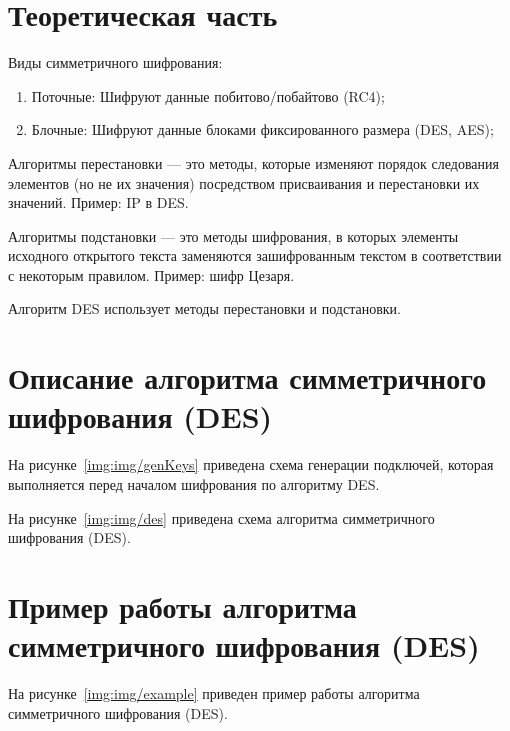 \chapter{Теоретическая часть}

Виды симметричного шифрования:
\begin{enumerate}[label={\arabic*)}]
	\item Поточные: Шифруют данные побитово/побайтово (RC4);
	\item Блочные: Шифруют данные блоками фиксированного размера (DES, AES);	
\end{enumerate}

Алгоритмы перестановки — это методы, которые изменяют порядок следования элементов (но не их значения) посредством присваивания и перестановки их значений. Пример: IP в DES.

Алгоритмы подстановки — это методы шифрования, в которых элементы исходного открытого текста заменяются зашифрованным текстом в соответствии с некоторым правилом. Пример: шифр Цезаря.

Алгоритм DES использует методы перестановки и подстановки.

\chapter{Описание алгоритма симметричного шифрования (DES)}

На рисунке~\ref{img:img/genKeys} приведена схема генерации подключей, которая выполняется перед началом шифрования по алгоритму DES.

\FloatBarrier
{}
\FloatBarrier

\clearpage
На рисунке~\ref{img:img/des} приведена схема алгоритма симметричного шифрования (DES).

\FloatBarrier
{}
\FloatBarrier



\chapter{Пример работы алгоритма симметричного шифрования (DES)}

На рисунке~\ref{img:img/example} приведен пример работы алгоритма симметричного шифрования (DES).

\FloatBarrier
{}
\FloatBarrier

